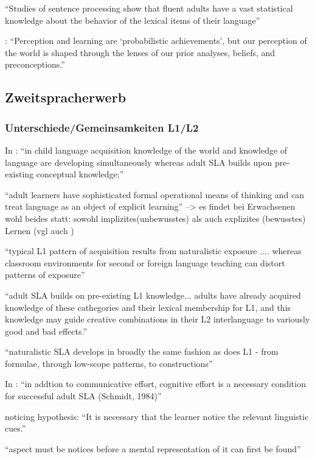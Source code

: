         ``Studies of sentence processing show that fluent adults have a vast statistical knowledge about the behavior of the lexical items of their language''

        \cite{Ellis06}: ``Perception and
        learning are ‘probabilistic achievements’, but our perception of the world is
        shaped through the lenses of our prior analyses, beliefs, and preconceptions.''

\subsection{Zweitspracherwerb}
\subsubsection{Unterschiede/Gemeinsamkeiten L1/L2}

        In \cite{Ellis08}: ``in child language acquisition knowledge of the world and knowledge of language are developing simultaneously whereas adult SLA builds upon pre-existing conceptual knowledge;''

        ``adult learners have sophisticated formal operational means of thinking and can treat language as an object of explicit learning''
        --> es findet bei Erwachsenen wohl beides statt: sowohl implizites(unbewusstes) als auch explizites (bewusstes) Lernen (vgl auch \cite{Ellis04})

        ``typical L1 pattern of acquisition results from naturalistic exposure .... whereas classroom environments for second or foreign language teaching can distort patterns of exposure''

        ``adult SLA builds on pre-existing L1 knowledge... adults have already acquired knowledge of these cathegories and their lexical membership for L1, and this knowledge may guide creative combinations in their L2 interlanguage to variously good and bad effects.''

        ``naturalistic SLA develops in broadly the same fashion as does L1 - from formulae, through low-scope patterns, to constructions''

        In \cite{Ellis04}: ``in addtion to communicative effort, cognitive effort is a necessary condition for successful adult SLA (Schmidt, 1984)''

        noticing hypothesis: ``It is necessary that the learner notice the relevant linguistic cues.''

        ``aspect must be notices before a mental representation of it can first be found''

